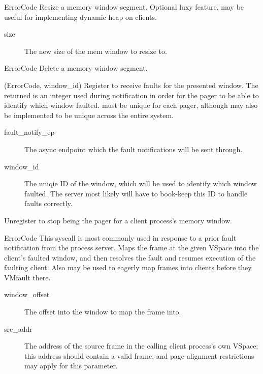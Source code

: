 \begin{description}
    \item {}
        {ErrorCode}
    Resize a memory window segment. Optional luxy feature, may be useful for implementing
    dynamic heap on clients.
    \begin{description}
        \item [size] The new size of the mem window to resize to.
    \end{description}

    \item {}
        {ErrorCode}
    Delete a memory window segment.

	\item {} 
	   {(ErrorCode, window\_id)} 
    Register to receive faults for the presented window. The returned  is an integer
    used during notification in order for the pager to be able to identify which window faulted.
     must be unique for each pager, although may also be implemented to be unique
    across the entire system.
    \begin{description}
        \item [fault\_notify\_ep] The async endpoint which the fault notifications will
                be sent through.
        \item [window\_id] The uniqie ID of the window, which will be used to identify which window
                faulted. The server most likely will have to book-keep this ID to handle faults
                correctly.
    \end{description}

    \item {} 
    Unregister to stop being the pager for a client process's memory window.

	\item {}
	   {ErrorCode}
	This syscall is most commonly used in response to a prior fault notification from the
    process server. Maps the frame at the given VSpace into the client's faulted window, and
    then resolves the fault and resumes execution of the faulting client. Also may be used to
    eagerly map frames into clients before they VMfault there.
    \begin{description}
        \item [window\_offset] The offset into the window to map the frame into.
        \item [src\_addr] The address of the source frame in the calling client process's own
                VSpace; this address should contain a valid frame, and page-alignment restrictions
                may apply for this parameter.
    \end{description}
	

\end{description}
